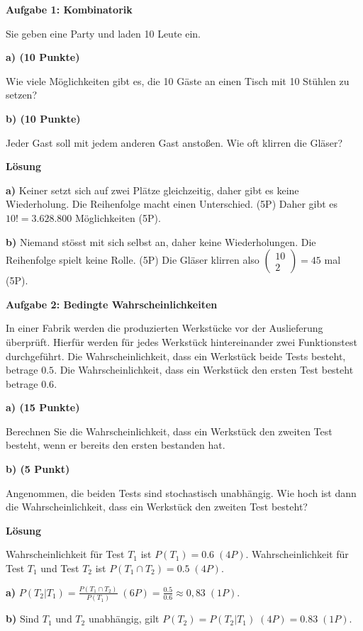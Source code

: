 \documentclass[a4paper,12pt]{article}
\begin{document}
{\bf Aufgabe 1: Kombinatorik}

Sie geben eine Party und laden 10 Leute ein.

{\bf a) (10 Punkte) }

Wie viele Möglichkeiten gibt es, die 10 Gäste an einen Tisch mit 10 Stühlen zu setzen?

{\bf b) (10 Punkte)}

 Jeder Gast soll mit jedem anderen Gast anstoßen. Wie oft klirren die Gläser?

{\bf Lösung}


{\bf a) }
Keiner setzt sich auf zwei Plätze gleichzeitig, daher gibt es keine Wiederholung. Die Reihenfolge macht einen Unterschied. (5P) Daher gibt es $10!= 3.628.800$ Möglichkeiten (5P). 

{\bf b) }
Niemand stösst mit sich selbst an, daher keine Wiederholungen. Die Reihenfolge spielt keine Rolle. (5P) Die Gläser klirren also $ \begin{pmatrix} 10 \\ 2\end{pmatrix} = 45$ mal (5P).
\hspace{10mm}



{\bf Aufgabe 2: Bedingte Wahrscheinlichkeiten}

In einer Fabrik werden die produzierten Werkstücke vor der Auslieferung überprüft. Hierfür werden für jedes Werkstück  hintereinander zwei Funktionstest durchgeführt.  Die Wahrscheinlichkeit, dass ein Werkstück beide Tests besteht, betrage $0.5$. Die Wahrscheinlichkeit, dass ein Werkstück  den ersten Test besteht betrage $0.6$. 

{\bf a) (15 Punkte) }

Berechnen Sie die Wahrscheinlichkeit, dass ein Werkstück den zweiten Test besteht, wenn er bereits den ersten bestanden hat.

{\bf b) (5 Punkt) }

Angenommen, die beiden Tests sind stochastisch unabhängig. Wie hoch ist dann die Wahrscheinlichkeit, dass ein Werkstück den zweiten Test besteht?

{\bf Lösung}

Wahrscheinlichkeit für  Test $T_1$  ist $P(T_1) = 0.6  \; (4P)$. Wahrscheinlichkeit für  Test $T_1$ und Test $T_2$ ist $P(T_1 \cap T_2) = 0.5  \; (4P)$.

{\bf a) }
$P(T_2 | T_1) = \frac{P(T_1 \cap T_2)}{P(T_1)}  \; (6P)= \frac{0.5} {0.6} \approx 0,83 \; (1P)$.


{\bf b) }
Sind $T_1$ und $T_2$ unabhängig, gilt  $P(T_2) = P(T_2 | T_1)  \; (4P) = 0.83  \; (1P)$.
\hspace{10mm}
\end{document}
